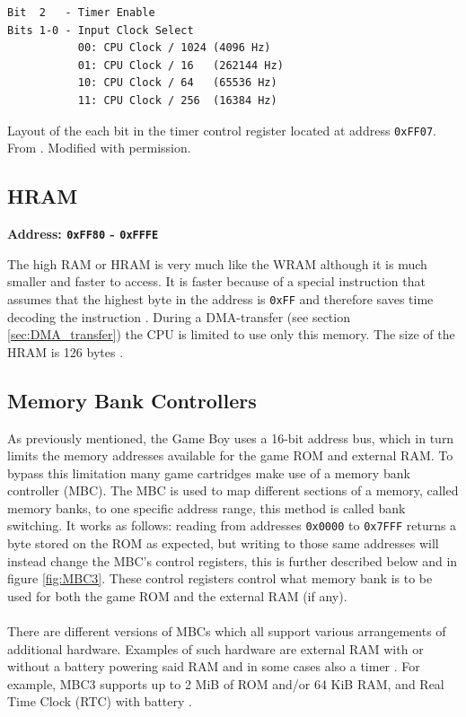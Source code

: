 \begin{table}[H]
    \begin{center}

\begin{BVerbatim}
Bit  2   - Timer Enable
Bits 1-0 - Input Clock Select
           00: CPU Clock / 1024 (4096 Hz)
           01: CPU Clock / 16   (262144 Hz)
           10: CPU Clock / 64   (65536 Hz)
           11: CPU Clock / 256  (16384 Hz)
\end{BVerbatim}

    \caption{Layout of the each bit in the timer control register located at address \texttt{0xFF07}. From \cite{pandocstimer}. Modified with permission.}
    \label{tab:timer_tac}
    \end{center}
\end{table}

\subsection{HRAM}
\textbf{Address: \texttt{0xFF80} - \texttt{0xFFFE}}

The high RAM or HRAM is very much like the WRAM although it is much smaller and faster to access. 
It is faster because of a special instruction that assumes that the highest byte in the address is \texttt{0xFF} and therefore saves time decoding the instruction \cite{OpCodes}. 
During a DMA-transfer (see section \ref{sec:DMA_transfer}) the CPU is limited to use only this memory.
The size of the HRAM is 126 bytes \cite{pandocsmemorymap}. 
\subsection{Memory Bank Controllers}
\label{sec:MBC}

As previously mentioned, the Game Boy uses a 16-bit address bus, which in turn limits the memory addresses available for the game ROM and external RAM. 
To bypass this limitation many game cartridges make use of a memory bank controller (MBC).
The MBC is used to map different sections of a memory, called memory banks, to one specific address range, this method is called bank switching.
It works as follows: reading from addresses \texttt{0x0000} to \texttt{0x7FFF} returns a byte stored on the ROM as expected, but writing to those same addresses will instead change the MBC's control registers, this is further described below and in figure \ref{fig:MBC3}. 
These control registers control what memory bank is to be used for both the game ROM and the external RAM (if any).
\\\\
There are different versions of MBCs which all support various arrangements of additional hardware. 
Examples of such hardware are external RAM with or without a battery powering said RAM and in some cases also a timer \cite{GBWikiMBC}. For example, MBC3 supports up to 2 MiB of ROM and/or 64 KiB RAM, and Real Time Clock (RTC) with battery \cite{GBWikiMBC}.

